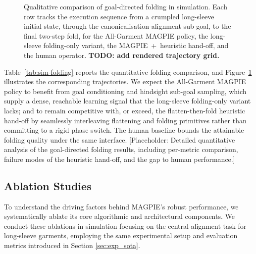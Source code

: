\documentclass[journal]{IEEEtran}
\begin{document}
\begin{figure}[!t]
    \centering
    \caption{Qualitative comparison of goal-directed folding in simulation. Each row tracks the execution sequence from a crumpled long-sleeve initial state, through the canonicalisation-alignment sub-goal, to the final two-step fold, for the All-Garment MAGPIE policy, the long-sleeve folding-only variant, the MAGPIE~+~heuristic hand-off, and the human operator. \textbf{TODO: add rendered trajectory grid.}}
    \label{fig:qualitative_folding}
\end{figure}

Table~\ref{tab:sim-folding} reports the quantitative folding comparison, and Figure~\ref{fig:qualitative_folding} illustrates the corresponding trajectories. We expect the All-Garment MAGPIE policy to benefit from goal conditioning and hindsight sub-goal sampling, which supply a dense, reachable learning signal that the long-sleeve folding-only variant lacks; and to remain competitive with, or exceed, the flatten-then-fold heuristic hand-off by seamlessly interleaving flattening and folding primitives rather than committing to a rigid phase switch. The human baseline bounds the attainable folding quality under the same interface.
[Placeholder: Detailed quantitative analysis of the goal-directed folding results, including per-metric comparison, failure modes of the heuristic hand-off, and the gap to human performance.]


\subsection{Ablation Studies}
\label{sec:exp_abl}

To understand the driving factors behind MAGPIE's robust performance, we systematically ablate its core algorithmic and architectural components. We conduct these ablations in simulation focusing on the central-alignment task for long-sleeve garments, employing the same experimental setup and evaluation metrics introduced in Section \ref{sec:exp_sota}.
\end{document}
